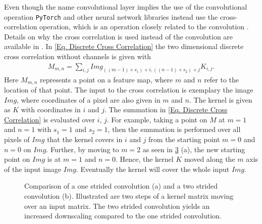 Even though the name convolutional layer implies the use of the convolutional operation \texttt{PyTorch} and other neural network libraries instead use the cross-correlation operation, which is an operation closely related to the convolution \cite{Goodfellow} \cite{Pytorch website}. Details on why the cross correlation is used instead of the convolution are available in \cite{Goodfellow}. In \cref{Eq. Discrete Cross Correlation} the two dimensional discrete cross correlation without channels is given with
\begin{align}
M_{m,n} = \sum_{i,j}Img_{((m-1)\times s_1)+i,((n-1)\times s_2)+j}K_{i,j}\mathrm{.}
\label{Eq. Discrete Cross Correlation}
\end{align}
Here $M_{m,n}$ represents a point on a feature map, where $m$ and $n$ refer to the location of that point. The input to the cross correlation is exemplary the image $Img$, where coordinates of a pixel are also given in $m$ and $n$. The kernel is given as $K$ with coordinates in $i$ and $j$. The summation in \cref{Eq. Discrete Cross Correlation} is evaluated over $i$, $j$. For example, taking a point on $M$ at $m=1$ and $n=1$ with $s_1=1$ and $s_2=1$, then the summation is performed over all pixels of $Img$ that the kernel covers in $i$ and $j$ from the starting point $m=0$ and $n=0$ on $Img$. Further, by moving to $m=2$ as seen in \cref{Fig: Downsampling} (a), the new starting point on $Img$ is at $m=1$ and $n=0$. Hence, the kernel $K$ moved along the $m$ axis of the input image $Img$. Eventually the kernel will cover the whole input $Img$.
\begin{figure}[htbp!]
	\begin{subfigure}{.459\textwidth}
		\centering
		
		\label{Fig: Downsampling(a)}
	\end{subfigure}\hfill
	\begin{subfigure}{.441\textwidth}
		\centering
		
		\label{Fig: Downsampling(b)}
	\end{subfigure}
	\caption{Comparison of a one strided convolution (a) and a two strided convolution (b). Illustrated are two steps of a kernel matrix moving over an input matrix. The two strided convolution yields an increased downscaling compared to the one strided convolution.}
	\label{Fig: Downsampling}
\end{figure}
